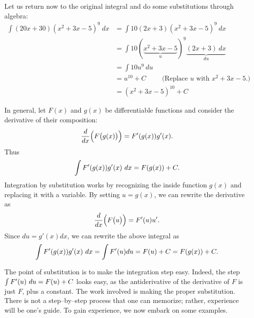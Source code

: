 Let us return now to the original integral and do some substitutions through algebra:
\allowdisplaybreaks
\begin{align*}
	\int (20x+30)(x^2+3x-5)^9\ dx 	&=	\int 10(2x+3)(x^2+3x-5)^9\ dx \\
									&=\int 10(\underbrace{x^2+3x-5}_u)^9\underbrace{(2x+3)\ dx}_{du} \\
									&=\int 10u^9\ du \\
									&= u^{10} + C \quad\quad \text{ (Replace $u$ with $x^2+3x-5$.)}\\
									&= (x^2+3x-5)^{10} +C
\end{align*}

In general, let $F(x)$ and $g(x)$ be differentiable functions and consider the derivative of their composition: 
	$$\frac{d}{dx}\Big(F\big(g(x)\big)\Big) = F'(g(x))g'(x).$$ Thus 
	$$\int F'(g(x))g'(x)\ dx = F(g(x)) + C.$$
Integration by substitution works by recognizing the inside function $g(x)$ and replacing it with a variable. By setting $u=g(x)$, we can rewrite the derivative as
	$$\frac{d}{dx}\Big(F\big(u\big)\Big) = F'(u)u'.$$
Since $du = g'(x)dx$, we can rewrite the above integral as
	$$\int F'(g(x))g'(x)\ dx = \int F'(u) du = F(u)+C = F(g(x))+ C.$$


The point of substitution is to make the integration step easy. Indeed, the step $\int F'(u)\ du = F(u) + C$ looks easy, as the antiderivative of the derivative of $F$ is just $F$, plus a constant. The work involved is making the proper substitution. There is not a step--by--step process that one can memorize; rather, experience will be one's guide. To gain experience, we now embark on some examples.

